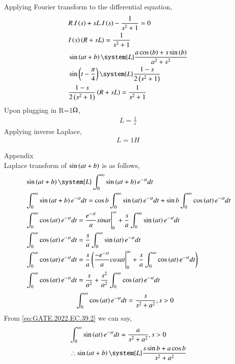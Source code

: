 \documentclass[journal,12pt,twocolumn]{IEEEtran}
\theoremstyle{remark}
\begin{document}
Applying Fourier transform to the differential equation,
\begin{align}
    &R.I\brak{s}+sL.I\brak{s}-\frac{1}{s^2+1}=0\\
    &I\brak{s}\brak{R+sL}=\frac{1}{s^2+1}\\
    &\sin\brak{at+b}\system{L}\frac{a\cos\brak{b}+s\sin\brak{b}}{a^{2}+s^{2}}\\
    &\sin\brak{t-\frac{\pi}{4}}\system{L}\frac{1-s}{2\brak{s^2+1}}\\
    &\frac{1-s}{2\brak{s^2+1}}\brak{R+sL}=\frac{1}{s^2+1}
\end{align}
Upon plugging in R=1$\ohm$,
\begin{align}
   L=\frac{1}{s}
\end{align}
Applying inverse Laplace,
\begin{align}
    L=1H
\end{align}

Appendix\\
Laplace transform of $\sin\left(at+b\right)$ is as follows,
\begin{align}
    &\sin\brak{at+b}\system{L}\int_{0}^{\infty}\sin\brak{at+b}e^{-st}dt\\
    &\int_{0}^{\infty}\sin\brak{at+b}e^{-st}dt=\cos{b}\int_{0}^{\infty}\sin\brak{at}e^{-st}dt+\sin{b}\int_{0}^{\infty}\cos\brak{at}e^{-st}dt\\
    &\int_{0}^{\infty}\cos\brak{at}e^{-st}dt=\frac{e^{-st}}{a}sin{at}\Bigg|_{0}^{\infty}+\frac{s}{a}\int_{0}^{\infty}\sin\brak{at}e^{-st}dt\\
    &\int_{0}^{\infty}\cos\brak{at}e^{-st}dt=\frac{s}{a}\int_{0}^{\infty}\sin\brak{at}e^{-st}dt\label{eq:GATE.2022.EC.39.2}\\
    &\int_{0}^{\infty}\cos\brak{at}e^{-st}dt=\frac{s}{a}\brak{\frac{-e^{-st}}{a}cos{at}\Bigg|_{0}^{\infty}+\frac{s}{a}\int_{0}^{\infty}\cos\brak{at}e^{-st}dt}\\
    &\int_{0}^{\infty}\cos\brak{at}e^{-st}dt=\frac{s}{a^2}+\frac{s^2}{a^2}\int_{0}^{\infty}\cos\brak{at}e^{-st}dt
\end{align}
\begin{align}
    &\int_{0}^{\infty}\cos\left(at\right)e^{-st}dt=\frac{s}{s^2+a^2},s>0
\end{align}
From \eqref{eq:GATE.2022.EC.39.2} we can say,
\begin{align}
    &\int_{0}^{\infty}\sin\brak{at}e^{-st}dt=\frac{a}{s^2+a^2},s>0\\
    &\therefore \sin\brak{at+b}\system{L}\frac{s\sin{b}+a\cos{b}}{s^2+a^2}
\end{align}
\end{document}
